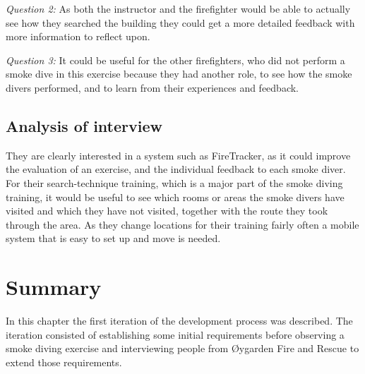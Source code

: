 \documentclass[../Main/thesis.tex]{subfiles}
\begin{document}
\textit{Question 2:}
As both the instructor and the firefighter would be able to actually see how they searched the building they could get a more detailed feedback with more information to reflect upon.

\textit{Question 3:}
It could be useful for the other firefighters, who did not perform a smoke dive in this exercise because they had another role, to see how the smoke divers performed, and to learn from their experiences and feedback.

\subsection{Analysis of interview}
They are clearly interested in a system such as FireTracker, as it could improve the evaluation of an exercise, and the individual feedback to each smoke diver.
For their search-technique training, which is a major part of the smoke diving training, it would be useful to see which rooms or areas the smoke divers have visited and which they have not visited, together with the route they took through the area.
As they change locations for their training fairly often a mobile system that is easy to set up and move is needed.

\section{Summary}
In this chapter the first iteration of the development process was described.
The iteration consisted of establishing some initial requirements before observing a smoke diving exercise and interviewing people from Øygarden Fire and Rescue to extend those requirements.

\blankpage
\end{document}
